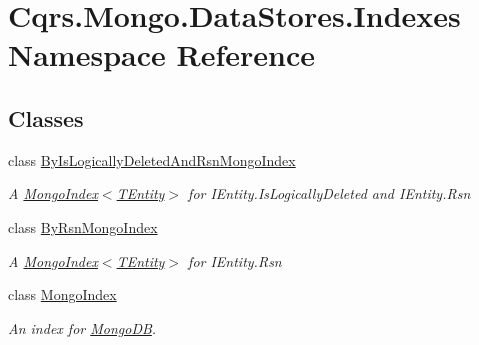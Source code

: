 \hypertarget{namespaceCqrs_1_1Mongo_1_1DataStores_1_1Indexes}{}\section{Cqrs.\+Mongo.\+Data\+Stores.\+Indexes Namespace Reference}
\label{namespaceCqrs_1_1Mongo_1_1DataStores_1_1Indexes}
\subsection*{Classes}
\begin{DoxyCompactItemize}
\item 
class \hyperlink{classCqrs_1_1Mongo_1_1DataStores_1_1Indexes_1_1ByIsLogicallyDeletedAndRsnMongoIndex}{By\+Is\+Logically\+Deleted\+And\+Rsn\+Mongo\+Index}
\begin{DoxyCompactList}\small\item\em A \hyperlink{classCqrs_1_1Mongo_1_1DataStores_1_1Indexes_1_1MongoIndex_a7affbb063520cd8c8bda27f8478efd06_a7affbb063520cd8c8bda27f8478efd06}{Mongo\+Index$<$\+T\+Entity$>$} for I\+Entity.\+Is\+Logically\+Deleted and I\+Entity.\+Rsn \end{DoxyCompactList}\item 
class \hyperlink{classCqrs_1_1Mongo_1_1DataStores_1_1Indexes_1_1ByRsnMongoIndex}{By\+Rsn\+Mongo\+Index}
\begin{DoxyCompactList}\small\item\em A \hyperlink{classCqrs_1_1Mongo_1_1DataStores_1_1Indexes_1_1MongoIndex_a7affbb063520cd8c8bda27f8478efd06_a7affbb063520cd8c8bda27f8478efd06}{Mongo\+Index$<$\+T\+Entity$>$} for I\+Entity.\+Rsn \end{DoxyCompactList}\item 
class \hyperlink{classCqrs_1_1Mongo_1_1DataStores_1_1Indexes_1_1MongoIndex}{Mongo\+Index}
\begin{DoxyCompactList}\small\item\em An index for \hyperlink{namespaceCqrs_1_1MongoDB}{Mongo\+DB}. \end{DoxyCompactList}\end{DoxyCompactItemize}
